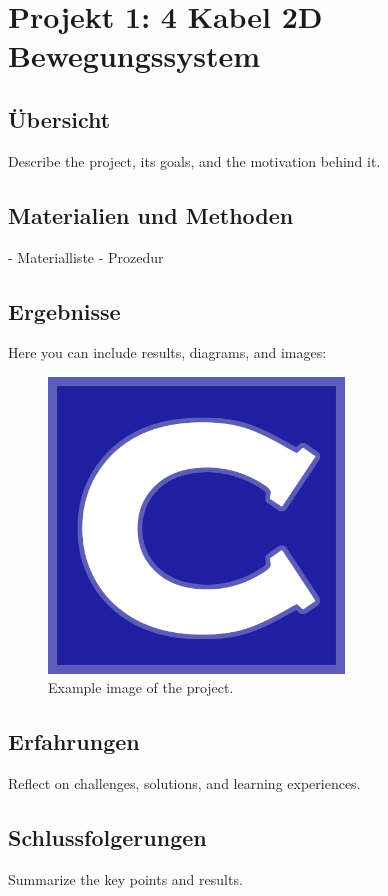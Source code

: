 \chapter{Projekt 1: 4 Kabel 2D Bewegungssystem}
\label{chap:project1}

\section{Übersicht}
Describe the project, its goals, and the motivation behind it.

\section{Materialien und Methoden}
- Materialliste
- Prozedur

\section{Ergebnisse}
Here you can include results, diagrams, and images:
\begin{figure}[h]
    \centering
    \includegraphics[width=0.7\textwidth]{P1/fig/example_image.png}
    \caption{Example image of the project.}
    \label{fig:example_image}
\end{figure}

\section{Erfahrungen}
Reflect on challenges, solutions, and learning experiences.

\section{Schlussfolgerungen}
Summarize the key points and results.

